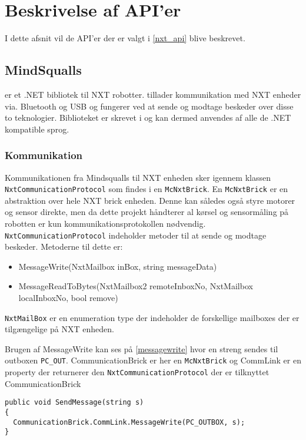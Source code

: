 
\section{Beskrivelse af API'er}

I dette afsnit vil de API'er der er valgt i \cref{nxt_api} blive beskrevet.

\subsection{MindSqualls}\label{mindsqualls}
\mindsqualls er et .NET bibliotek til \legos NXT robotter.
\mindsqualls tillader kommunikation med NXT enheder via. Bluetooth og USB og fungerer ved at sende og modtage beskeder over disse to teknologier.
Biblioteket er skrevet i \csharp og kan dermed anvendes af alle de .NET kompatible sprog.

\subsubsection{Kommunikation}
Kommunikationen fra Mindsqualls til NXT enheden sker igennem klassen \lstinline!NxtCommunicationProtocol! som findes i en \lstinline!McNxtBrick!. 
En \lstinline!McNxtBrick! er en abstraktion over hele NXT brick enheden. 
Denne kan således også styre motorer og sensor direkte, men da dette projekt håndterer al kørsel og sensormåling på robotten er kun kommunikationsprotokollen nødvendig.
\lstinline!NxtCommunicationProtocol! indeholder metoder til at sende og modtage beskeder. 
Metoderne til dette er:

\begin{itemize}
\item MessageWrite(NxtMailbox inBox, string messageData)
\item MessageReadToBytes(NxtMailbox2 remoteInboxNo, NxtMailbox localInboxNo, bool remove)
\end{itemize}

\lstinline!NxtMailBox! er en enumeration type der indeholder de forskellige mailboxes der er tilgængelige på NXT enheden.

Brugen af MessageWrite kan ses på \cref{messagewrite} hvor en streng sendes til outboxen \lstinline!PC_OUT!.
CommunicationBrick er her en \lstinline!McNxtBrick! og CommLink er en property der returnerer den \lstinline!NxtCommunicationProtocol! der er tilknyttet CommunicationBrick 

\begin{lstlisting}[style=c,label=messagewrite, caption={Brug af MessageWrite}]
public void SendMessage(string s)
{
  CommunicationBrick.CommLink.MessageWrite(PC_OUTBOX, s);
}
\end{lstlisting}

